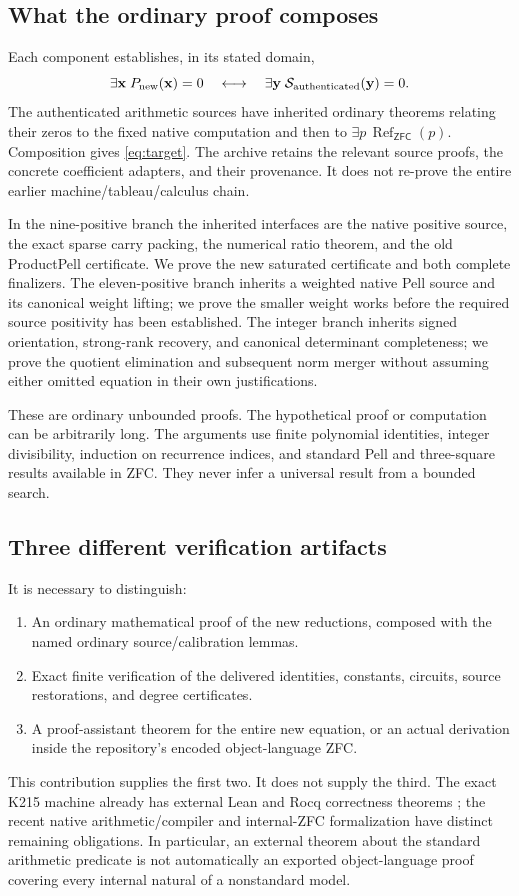 \documentclass[11pt,a4paper]{article}
\newcommand{\RefZFC}{\operatorname{Ref}_{\mathsf{ZFC}}}
\theoremstyle{definition}
\theoremstyle{remark}
\numberwithin{equation}{section}
\begin{document}
\subsection{What the ordinary proof composes}

Each component establishes, in its stated domain,
\[
 \exists\mathbf x\;P_{\rm new}(\mathbf x)=0
 \quad\longleftrightarrow\quad
 \exists\mathbf y\;\mathcal S_{\rm authenticated}(\mathbf y)=0.
\]
The authenticated arithmetic sources have inherited ordinary theorems
relating their zeros to the fixed native computation and then to
\(\exists p\,\RefZFC(p)\). Composition gives
\eqref{eq:target}. The archive retains the relevant source proofs,
the concrete coefficient adapters, and their provenance.
It does not re-prove the entire earlier machine/tableau/calculus chain.

In the nine-positive branch the inherited interfaces are the native
positive source, the exact sparse carry packing, the numerical ratio
theorem, and the old ProductPell certificate. We prove the new saturated
certificate and both complete finalizers. The eleven-positive branch
inherits a weighted native Pell source and its canonical weight lifting;
we prove the smaller weight works before the required source positivity
has been established. The integer branch inherits signed orientation,
strong-rank recovery, and canonical determinant completeness; we prove
the quotient elimination and subsequent norm merger without assuming
either omitted equation in their own justifications.

These are ordinary unbounded proofs. The hypothetical proof or computation
can be arbitrarily long. The arguments use finite polynomial identities,
integer divisibility, induction on recurrence indices, and standard
Pell and three-square results available in ZFC. They never infer a
universal result from a bounded search.

\subsection{Three different verification artifacts}

It is necessary to distinguish:
\begin{enumerate}
 \item An ordinary mathematical proof of the new reductions, composed
 with the named ordinary source/calibration lemmas.
 \item Exact finite verification of the delivered identities, constants,
 circuits, source restorations, and degree certificates.
 \item A proof-assistant theorem for the entire new equation, or an
 actual derivation inside the repository's encoded object-language ZFC.
\end{enumerate}
This contribution supplies the first two. It does not supply the third.
The exact K215 machine already has external Lean and Rocq correctness
theorems \cite{repo}; the recent native arithmetic/compiler and internal-ZFC
formalization have distinct remaining obligations. In particular, an
external theorem about the standard arithmetic predicate is not
automatically an exported object-language proof covering every internal
natural of a nonstandard model.
\end{document}
